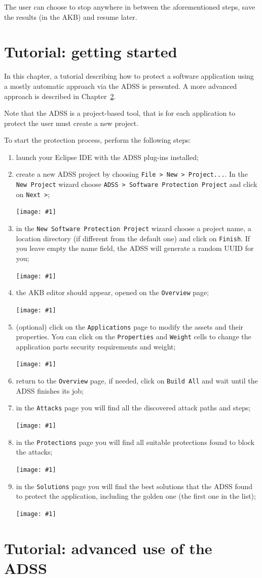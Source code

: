 \documentclass{memoir}
\newcommand{\UI}[1]{\texttt{#1}}
\newcommand{\ScreenShot}[1]
{
	\begin{center}
		\texttt{[image: \#1]}
	\end{center}
}
\begin{document}
	The user can choose to stop anywhere in between the aforementioned steps, save the results (in the AKB) and resume later.
	
	\chapter{Tutorial: getting started}
	
	In this chapter, a tutorial describing how to protect a software application using a mostly automatic approach via the ADSS is presented. A more advanced approach is described in Chapter~\ref{ch:advancedUse}.

	Note that the ADSS is a project-based tool, that is for each application to protect the user must create a new project.
	
	\begin{center}
	\end{center}
	
	To start the protection process, perform the following steps:
	 
	 \begin{enumerate}
	 	\item launch your Eclipse IDE with the ADSS plug-ins installed;
	 	\item create a new ADSS project by choosing \UI{File > New > Project...}. In the \UI{New Project} wizard choose \UI{ADSS > Software Protection Project} and click on \UI{Next >};
		 	\ScreenShot{images/newProjectWizard.png}
	 	\item in the \UI{New Software Protection Project} wizard choose a project name, a location directory (if different from the default one) and click on \UI{Finish}. If you leave empty the name field, the ADSS will generate a random UUID for you;
		 	\ScreenShot{images/newSWProtectionProjectWizard.png}
	 	\item the AKB editor should appear, opened on the \UI{Overview} page;
		 	\ScreenShot{images/akbEditor.png}
	 	\item (optional) click on the \UI{Applications} page to modify the assets and their properties. You can click on the \UI{Properties} and \UI{Weight} cells to change the application parts security requirements and weight;
		 	\ScreenShot{images/applicationsPage.png}
	 	\item return to the \UI{Overview} page, if needed, click on \UI{Build All} and wait until the ADSS finishes its job;
	 	\item in the \UI{Attacks} page you will find all the discovered attack paths and steps;
		 	\ScreenShot{images/attacksPage.png}
		\item in the \UI{Protections} page you will find all suitable protections found to block the attacks;
			 \ScreenShot{images/protectionsPage.png}
		\item in the \UI{Solutions} page you will find the best solutions that the ADSS found to protect the application, including the golden one (the first one in the list);
			\ScreenShot{images/solutionsPage.png}
	 \end{enumerate}
		
	\chapter{Tutorial: advanced use of the ADSS}\label{ch:advancedUse}

	
\end{document}
